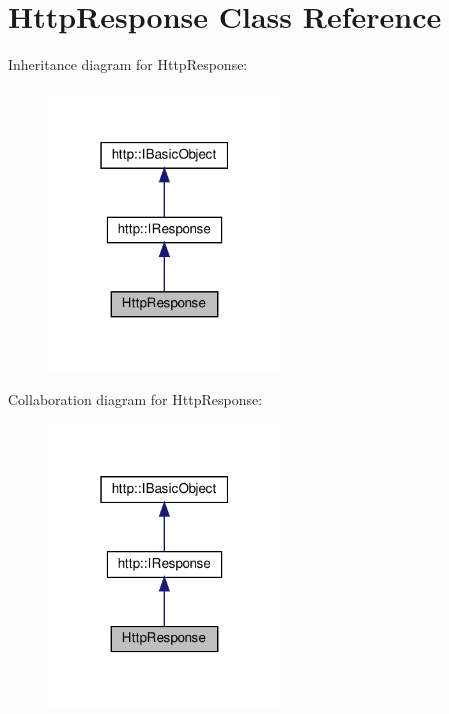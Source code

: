 \hypertarget{classHttpResponse}{}\section{Http\+Response Class Reference}
\label{classHttpResponse}


Inheritance diagram for Http\+Response\+:
\nopagebreak
\begin{figure}[H]
\begin{center}
\leavevmode
\includegraphics[width=175pt]{classHttpResponse__inherit__graph}
\end{center}
\end{figure}


Collaboration diagram for Http\+Response\+:
\nopagebreak
\begin{figure}[H]
\begin{center}
\leavevmode
\includegraphics[width=175pt]{classHttpResponse__coll__graph}
\end{center}
\end{figure}
